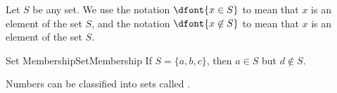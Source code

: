 Let $S$ be any set. We use the notation $\dfont{x\in S}$ to mean that $x$ 
is an element  of the set $S$, and the notation $\dfont{x\not\in S}$ to mean that $x$ is  an element of the set $S$. \\


\begin{example}{Set Membership}{SetMembership}
If $S=\{a,b,c\}$, then $a\in S$ but $d\not\in S$.
\end{example}

%

Numbers can be classified into sets called .


